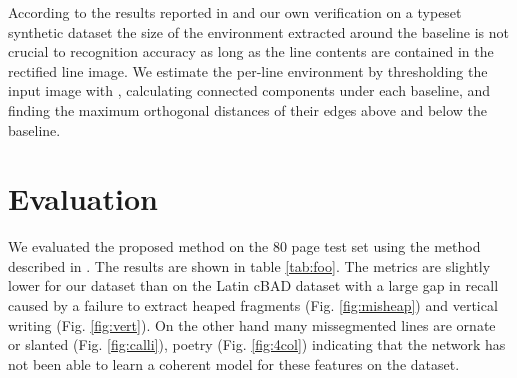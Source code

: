 According to the results reported in \cite{romero2015influence} and our own
verification on a typeset synthetic dataset the size of the environment
extracted around the baseline is not crucial to recognition accuracy as long as
the line contents are contained in the rectified line image. We estimate the
per-line environment by thresholding the input image with
\cite{sauvola2000adaptive}, calculating connected components under each
baseline, and finding the maximum orthogonal distances of their edges above and
below the baseline.


\section{Evaluation}

We evaluated the proposed method on the 80 page test set using the method
described in \cite{gruning2018read}. The results are shown in table
\ref{tab:foo}. The metrics are slightly lower for our dataset than on the Latin
cBAD dataset with a large gap in recall caused by a failure to extract heaped
fragments (Fig. \ref{fig:misheap}) and vertical writing (Fig. 
\ref{fig:vert}). On the other hand many missegmented lines are ornate or
slanted (Fig. \ref{fig:calli}), poetry (Fig. \ref{fig:4col}) indicating
that the network has not been able to learn a coherent model for these features
on the dataset.

